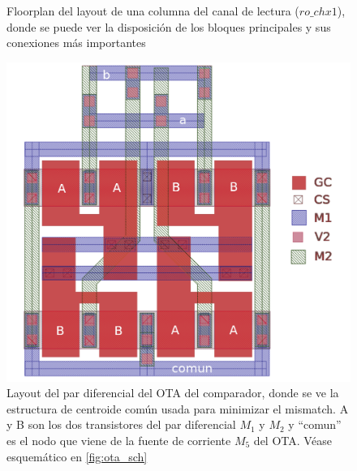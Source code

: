 \begin{figure}[h]
\centering
\begin{minipage}{0.48\textwidth}
	
	\caption[Floorplan de una columna de canal de lectura]
	{Floorplan del layout de una columna del canal de lectura ($ro\_chx1$),
	donde se puede ver la disposición de los bloques principales y sus conexiones
	más importantes}
	\label{fig:ro_chx1}
\end{minipage}
\hfill
\begin{minipage}{0.48\textwidth}
	\includegraphics[width=\textwidth]{img/OTA_simple_layout.png}
	\caption[Layout del par diferencial del OTA del comparador]
	{Layout del par diferencial del OTA del comparador, donde se ve
	la estructura de centroide común usada para minimizar el mismatch.
	A y B son los dos transistores del par diferencial $M_1$ y $M_2$ y ``comun'' es
	el nodo que viene de la fuente de corriente $M_5$ del OTA. Véase
	esquemático en \ref{fig:ota_sch}}
	\label{fig:ota_simple_layout}
\end{minipage}
\end{figure}
